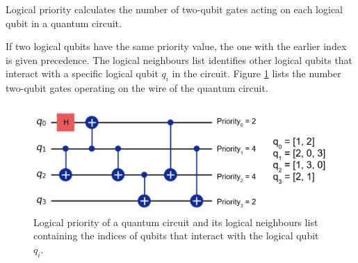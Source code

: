 \begin{definition} %
    Logical priority calculates the number of two-qubit gates acting on each logical qubit in a quantum circuit.
\end{definition}
If two logical qubits have the same priority value, the one with the earlier index is given precedence. The logical neighbours list identifies other logical qubits that interact with a specific logical qubit $q_i$ in the circuit. Figure \ref{fig:logical-priority} lists the number two-qubit gates operating on the wire of the quantum circuit.
\begin{figure}[h]
    \centering
    \includegraphics[width=0.7\linewidth]{image/logical_priority.png}
    \caption{Logical priority of a quantum circuit and its logical neighbours list containing the indices of qubits that interact with the logical qubit $q_i$.}
    \label{fig:logical-priority}
\end{figure}

